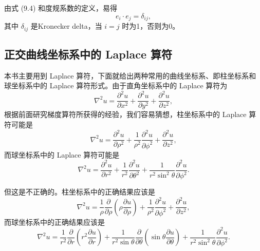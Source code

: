 由式 (9.4) 和度规系数的定义，易得
\[
e_i \cdot e_j = \delta_{ij},
\]
其中 $\delta_{ij}$ 是Kronecker delta，当 $i = j$ 时为1，否则为0。


\subsection{正交曲线坐标系中的 Laplace 算符}

本书主要用到 Laplace 算符，下面就给出两种常用的曲线坐标系、即柱坐标系和球坐标系中的 Laplace 算符形式。由于直角坐标系中的 Laplace 算符为
\begin{equation}
\nabla^2 u = \frac{\partial^2 u}{\partial x^2} + \frac{\partial^2 u}{\partial y^2} + \frac{\partial^2 u}{\partial z^2},
\end{equation}
根据前面研究梯度算符所获得的经验，我们容易猜想，柱坐标系中的 Laplace 算符可能是
\begin{equation}
\nabla^2 u = \frac{\partial^2 u}{\partial \rho^2} + \frac{1}{\rho^2} \frac{\partial^2 u}{\partial \phi^2} + \frac{\partial^2 u}{\partial z^2},
\end{equation}
而球坐标系中的 Laplace 算符可能是
\begin{equation}
\nabla^2 u = \frac{\partial^2 u}{\partial r^2} + \frac{1}{r^2} \frac{\partial^2 u}{\partial \theta^2} + \frac{1}{r^2 \sin^2 \theta} \frac{\partial^2 u}{\partial \phi^2}.
\end{equation}

但这是不正确的。柱坐标系中的正确结果应该是
\begin{equation}
\nabla^2 u = \frac{1}{\rho} \frac{\partial}{\partial \rho} \left( \rho \frac{\partial u}{\partial \rho} \right) + \frac{1}{\rho^2} \frac{\partial^2 u}{\partial \phi^2} + \frac{\partial^2 u}{\partial z^2},
\end{equation}
而球坐标系中的正确结果应该是
\begin{equation}
\nabla^2 u = \frac{1}{r^2} \frac{\partial}{\partial r} \left( r^2 \frac{\partial u}{\partial r} \right) + \frac{1}{r^2 \sin \theta} \frac{\partial}{\partial \theta} \left( \sin \theta \frac{\partial u}{\partial \theta} \right) + \frac{1}{r^2 \sin^2 \theta} \frac{\partial^2 u}{\partial \phi^2}.
\end{equation}